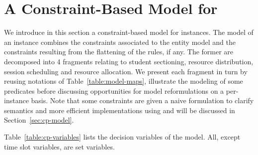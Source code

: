 \section{A Constraint-Based Model for {\UTP}}
\label{sec:model}
\setcounter{equation}{0}
We introduce in this section a constraint-based model for {\UTP} instances.
The model of an instance combines the constraints associated to the entity model and the constraints resulting from the flattening of the rules, if any. 
The former are decomposed into 4 fragments relating to student sectioning, resource distribution, session scheduling and resource allocation.
We present each fragment in turn by reusing notations of Table~\ref{table:model-maps}, illustrate the modeling of some predicates before discussing opportunities for model reformulations on a per-instance basis.
Note that some constraints are given a naive formulation to clarify semantics and more efficient implementations using {\MINIZINC} and {\CHR} will be discussed in Section~\ref{sec:cp-model}.

Table~\ref{table:cp-variables} lists the decision variables of the model. 
All, except time slot variables, are set variables. 

